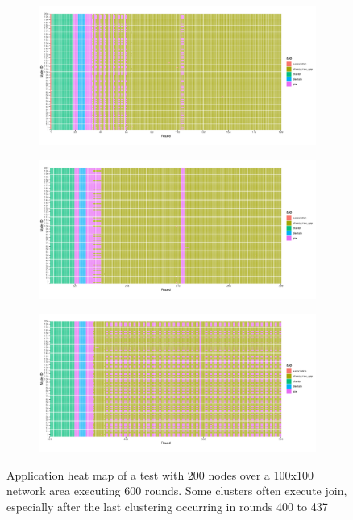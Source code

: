 \begin{figure}[H]
\label{fig:application-map-200-nodes}
    \centering
    \begin{subfigure}{0.9\textwidth}
        \centering
        \includegraphics[width=\textwidth]{figure/Results/ReliabilityDiscussionApplicationHeatmaps/applicationmap200x200_1.pdf}
        \label{subfig:application-map-200-nodes-round-1-199}
    \end{subfigure}
    \hfill
    \begin{subfigure}{0.9\textwidth}
        \centering
        \includegraphics[width=\textwidth]{figure/Results/ReliabilityDiscussionApplicationHeatmaps/applicationmap200x200_2.pdf}
        \label{subfig:application-map-200-nodes-round-200-399}
    \end{subfigure}
    \begin{subfigure}{0.9\textwidth}
        \centering
        \includegraphics[width=\textwidth]{figure/Results/ReliabilityDiscussionApplicationHeatmaps/applicationmap200x200__3.pdf}
        \label{subfig:application-map-200-nodes-round-400-599}
    \end{subfigure}
    \caption{Application heat map of a test with 200 nodes over a 100x100 network area executing 600 rounds. Some clusters often execute join, especially after the last clustering occurring in rounds 400 to 437}
\end{figure}